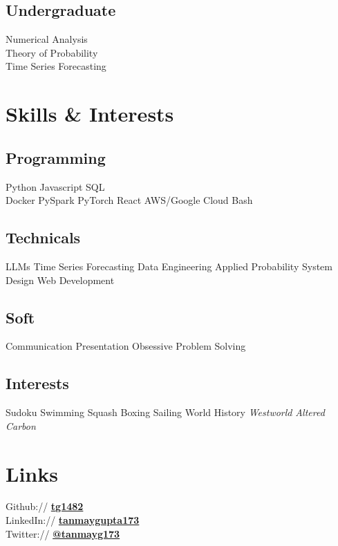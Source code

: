 \documentclass[]{deedy-resume-openfont}
\begin{document}
\begin{minipage}[t]{0.28\textwidth}
\sectionsep

\subsection{Undergraduate}
Numerical Analysis \\
Theory of Probability \\
Time Series Forecasting \\
\sectionsep


\section{Skills \& Interests}
\subsection{Programming}
Python \textbullet{} Javascript \textbullet{} SQL \\ 
Docker \textbullet{} PySpark \textbullet{}
PyTorch \textbullet{} React \textbullet{} AWS/Google Cloud \textbullet{} Bash
\sectionsep 

\subsection{Technicals}
LLMs \textbullet{} Time Series Forecasting \textbullet{} Data Engineering \textbullet{} Applied Probability \textbullet{} System Design  \textbullet{} Web Development
\sectionsep

\subsection{Soft}
Communication \textbullet{} Presentation \textbullet{} Obsessive Problem Solving
\sectionsep

\subsection{Interests}
Sudoku \textbullet{} Swimming \textbullet{} Squash \textbullet{} Boxing \textbullet{} Sailing \textbullet{} World History \textbullet{} \textit{Westworld} \textbullet{} \textit{Altered Carbon}
\sectionsep


\section{Links} 
Github:// \href{https://github.com/tg1482}{\bf tg1482} \\
LinkedIn://  \href{https://www.linkedin.com/in/tanmaygupta173}{\bf tanmaygupta173} \\
Twitter:// \href{https://twitter.com/tanmayg173}{\bf @tanmayg173} \\


%
%

\end{minipage} 
\end{document}
